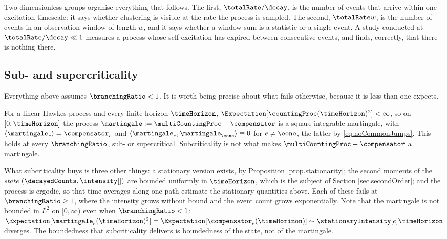 Two dimensionless groups organise everything that follows.
The first, $\totalRate/\decay$, is the number of events that arrive within one excitation
timescale: it says whether clustering is visible at the rate the process is sampled.
The second, $\totalRate w$, is the number of events in an observation window of length $w$,
and it says whether a window sum is a statistic or a single event.
A study conducted at $\totalRate/\decay \ll 1$ measures a process whose self-excitation has
expired between consecutive events, and finds, correctly, that there is nothing there.

\subsection{Sub- and supercriticality}

Everything above assumes $\branchingRatio < 1$.
It is worth being precise about what fails otherwise, because it is less than one expects.

For a linear Hawkes process and every finite horizon $\timeHorizon$,
$\Expectation[\countingProc(\timeHorizon)^2] < \infty$,
so on $[0,\timeHorizon]$ the process
$\martingale := \multiCountingProc - \compensator$
is a square-integrable martingale,
with $\langle \martingale_e \rangle = \compensator_e$
and $\langle \martingale_e, \martingale_{\eone} \rangle \equiv 0$ for $e \neq \eone$,
the latter by \eqref{eq.noCommonJumps}.
This holds at every $\branchingRatio$, sub- or supercritical.
Subcriticality is not what makes $\multiCountingProc - \compensator$ a martingale.

What subcriticality buys is three other things:
a stationary version exists, by Proposition \ref{prop.stationarity};
the second moments of the \emph{state} $(\decayedCounts, \intensity[ ])$ are bounded uniformly
in $\timeHorizon$, which is the subject of Section \ref{sec.secondOrder};
and the process is ergodic, so that time averages along one path estimate the stationary
quantities above.
Each of these fails at $\branchingRatio \geq 1$, where the intensity grows without bound and
the event count grows exponentially.
Note that the martingale is not bounded in $L^2$ on $[0,\infty)$ even when
$\branchingRatio<1$:
$\Expectation[\martingale_e(\timeHorizon)^2] = \Expectation[\compensator_e(\timeHorizon)]
\sim \stationaryIntensity[e] \timeHorizon$ diverges.
The boundedness that subcriticality delivers is boundedness of the state, not of the martingale.

